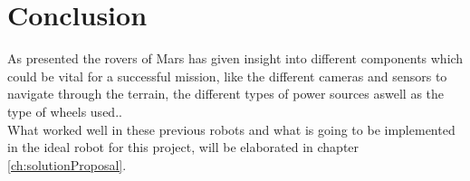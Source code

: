 \section{Conclusion}
As presented the rovers of Mars has given insight into different components which could be vital for a successful mission, like the different cameras and sensors to navigate through the terrain, the different types of power sources aswell as the type of wheels used..\\ 
What worked well in these previous robots and what is going to be implemented in the ideal robot for this project, will be elaborated in chapter \ref{ch:solutionProposal}.